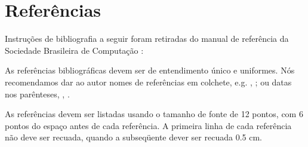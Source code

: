 \documentclass[a4paper, 12pt]{article}
\newcommand{\citeb}[1]{\bibleftbracket\cite{#1}\bibrightbracket}
\begin{document}
    \section*{Referências}
    Instruções de bibliografia a seguir foram retiradas do manual de referência
    da Sociedade Brasileira de Computação \citeb{sbc}:

    As referências bibliográficas devem ser de entendimento único e uniformes.
    Nós recomendamos dar ao autor nomes de referências em colchete, e.g.
    \citeb{knuth}, \citeb{smith};
    ou datas nos parênteses, \textcite{knuth}, \textcite{smith}.
    
    As referências devem ser listadas usando o tamanho de fonte de 12 pontos,
    com 6 pontos do espaço antes de cada referência.
    A primeira linha de cada referência não deve ser recuada,
    quando a subseqüente dever ser recuada 0.5 cm.
    \clearpage
    \nocite{*}
    \sectionfont{\raggedright}
    \printbibliography
\end{document}
